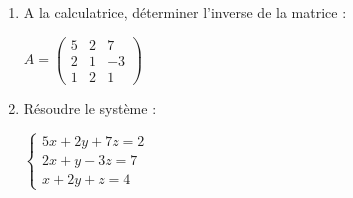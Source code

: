 
%
\begin{enumerate}
     \item
     A la calculatrice, déterminer l'inverse de la matrice :
     \begin{center}$A=\begin{pmatrix} 5 & 2 & 7 \\ 2 & 1 & -3 \\ 1 & 2 & 1 \end{pmatrix}$\end{center}
     \item
     Résoudre le système :
     \par
     $\left\{ \begin{matrix} 5x+2y+7z=2 \\ 2x+y-3z=7 \\ x+2y+z=4 \end{matrix}\right.$
     \end{enumerate}
